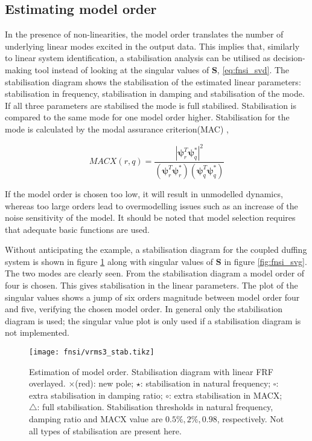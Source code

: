 \subsection{Estimating model order}

In the presence of non-linearities, the model order translates the number of
underlying linear modes excited in the output data. This implies that, similarly
to linear system identification, a stabilisation analysis can be utilised as
decision-making tool instead of looking at the singular values of $\bm S$,
\eqref{eq:fnsi_svd}. The stabilisation diagram shows the stabilisation of the
estimated linear parameters: stabilisation in frequency, stabilisation in
damping and stabilisation of the mode. If all three parameters are stabilised
the mode is full stabilised. Stabilisation is compared to the same mode for one
model order higher. Stabilisation for the mode is calculated by the modal
assurance criterion(MAC) \autocite{Allemang2003},

\begin{equation}
  MACX(r,q) = \frac{|\bm \psi^T_r \bm \psi^*_q|^2}
  {\left( \bm \psi^T_r \bm \psi^*_r \right)\left( \bm \psi^T_q \bm \psi^*_q \right)}
\end{equation}



If the model order is chosen too low, it will result in unmodelled dynamics,
whereas too large orders lead to overmodelling issues such as an increase of the
noise sensitivity of the model. It should be noted that model selection requires
that adequate basic functions are used.

Without anticipating the example, a stabilisation diagram for the coupled
duffing system is shown in figure \ref{fig:fnsi_stab} along with singular values
of $\bm S$ in figure \ref{fig:fnsi_svg}. The two modes are clearly seen.
From the stabilisation diagram a model order of four is chosen. This gives
stabilisation in the linear parameters. The plot of the singular values shows a
jump of six orders magnitude between model order four and five, verifying the
chosen model order.
In general only the stabilisation diagram is used; the singular value plot is
only used if a stabilisation diagram is not implemented.

\begin{figure}
  \centering
  \texttt{[image: fnsi/vrms3\_stab.tikz]}
  \caption{Estimation of model order. Stabilisation diagram with linear FRF overlayed.
    $\pmb\times$(red): new pole;
    $\pmb\star$: stabilisation in natural frequency;
    $\pmb\square$: extra stabilisation in damping ratio;
    $\pmb\circ$: extra stabilisation in MACX;
    $\pmb\triangle$: full stabilisation.
    Stabilisation thresholds in natural frequency, damping ratio and MACX value
    are $0.5\%, 2\%, 0.98$, respectively. Not all types of stabilisation are
    present here.
  }
  \label{fig:fnsi_stab}
\end{figure}

